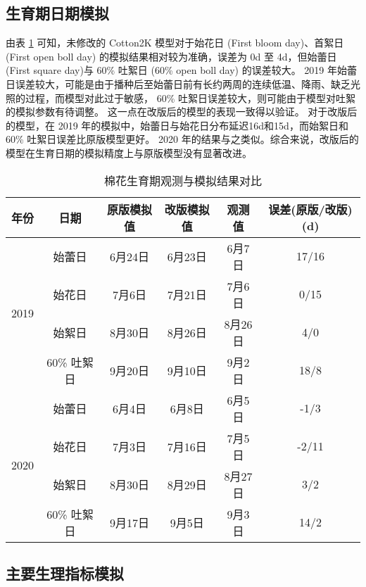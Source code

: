 \subsection{生育期日期模拟}
由表 \ref{tab:lifecycle} 可知，未修改的 Cotton2K 模型对于始花日 (First bloom day)、首絮日 (First open boll day)
的模拟结果相对较为准确，误差为 0d 至 4d，但始蕾日 (First square day)与 60\% 吐絮日 (60\% open boll day) 的误差较大。%
2019 年始蕾日误差较大，可能是由于播种后至始蕾日前有长约两周的连续低温、降雨、缺乏光照的过程，而模型对此过于敏感，%
60\% 吐絮日误差较大，则可能由于模型对吐絮的模拟参数有待调整。%
这一点在改版后的模型的表现一致得以验证。
对于改版后的模型，在 2019 年的模拟中，始蕾日与始花日分布延迟16d和15d，而始絮日和60\% 吐絮日误差比原版模型更好。%
2020 年的结果与之类似。综合来说，改版后的模型在生育日期的模拟精度上与原版模型没有显著改进。

\begin{table}
    \caption{棉花生育期观测与模拟结果对比}\label{tab:lifecycle}
    \begin{tabular}{cccccc}
        \toprule
        年份                  & 日期        & 原版模拟值 & 改版模拟值 & 观测值  & 误差(原版/改版) (d) \\
        \midrule
        \multirow{4}{*}{2019} & 始蕾日      & 6月24日    & 6月23日    & 6月7日  & 17/16               \\
                              & 始花日      & 7月6日     & 7月21日    & 7月6日  & 0/15                \\
                              & 始絮日      & 8月30日    & 8月26日    & 8月26日 & 4/0                 \\
                              & 60\% 吐絮日 & 9月20日    & 9月10日    & 9月2日  & 18/8                \\
        \hline
        \multirow{4}{*}{2020} & 始蕾日      & 6月4日     & 6月8日     & 6月5日  & -1/3                \\
                              & 始花日      & 7月3日     & 7月16日    & 7月5日  & -2/11               \\
                              & 始絮日      & 8月30日    & 8月29日    & 8月27日 & 3/2                 \\
                              & 60\% 吐絮日 & 9月17日    & 9月5日     & 9月3日  & 14/2                \\
        \bottomrule
    \end{tabular}
\end{table}

\subsection{主要生理指标模拟}

